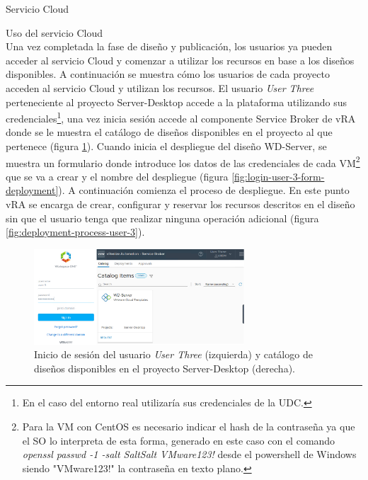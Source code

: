 \begin{subsection}{Servicio Cloud}
\begin{subsubsection}{Uso del servicio Cloud}
        \\
        Una vez completada la fase de diseño y publicación, los usuarios ya pueden acceder al servicio Cloud y comenzar a utilizar los recursos en base a los diseños disponibles. A continuación se muestra cómo los usuarios de cada proyecto acceden al servicio Cloud y utilizan los recursos. 
        El usuario \textit{User Three} perteneciente al proyecto Server-Desktop accede a la plataforma utilizando sus credenciales\footnote{En el caso del entorno real utilizaría sus credenciales de la UDC.}, una vez inicia sesión accede al componente Service Broker de vRA donde se le muestra el catálogo de diseños disponibles en el proyecto al que pertenece (figura \ref{fig:login-user-3-catalog}). Cuando inicia el despliegue del diseño WD-Server, se muestra un formulario donde introduce los datos de las credenciales de cada VM\footnote{Para la VM con CentOS es necesario indicar el hash de la contraseña ya que el SO lo interpreta de esta forma, generado en este caso con el comando \textit{openssl passwd -1 -salt SaltSalt VMware123!} desde el powershell de Windows siendo "VMware123!" la contraseña en texto plano.} que se va a crear y el nombre del despliegue (figura \ref{fig:login-user-3-form-deployment}). A continuación comienza el proceso de despliegue. En este punto vRA se encarga de crear, configurar y reservar los recursos descritos en el diseño sin que el usuario tenga que realizar ninguna operación adicional (figura \ref{fig:deployment-process-user-3}).
        \begin{figure}[h]
            \centering
            \includegraphics[width=0.7\textwidth]{imaxes/pruebaconcepto/vrealize/login-user-3-credentials.png}
            \caption{Inicio de sesión del usuario \textit{User Three} (izquierda) y catálogo de diseños disponibles en el proyecto Server-Desktop (derecha).}
            \label{fig:login-user-3-catalog}
        \end{figure}
        \FloatBarrier
        \begin{figure}[h]
            \centering

\end{figure}
\end{subsubsection}
\end{subsection}
